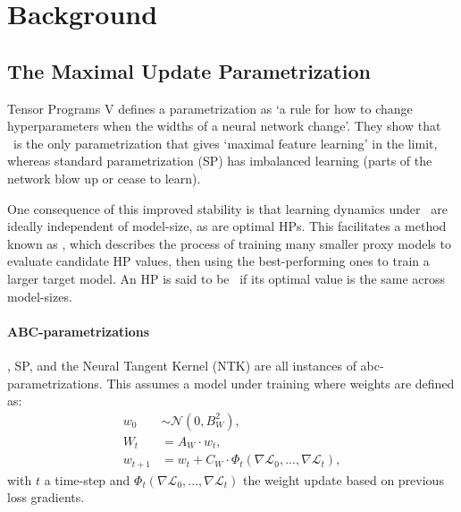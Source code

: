 \section{Background} \label{sec:background}

\subsection{The Maximal Update Parametrization} \label{sec:background:the_maximal_update_parameterization}

Tensor Programs V \citep{Tensor_Programs_V} defines a parametrization as `a rule for how to change hyperparameters when the widths of a neural network change'. They show that \mup\ is the only parametrization that gives `maximal feature learning' in the limit,
whereas standard parametrization (SP) has imbalanced learning (parts of the network blow up or cease to learn).

One consequence of this improved stability is that learning dynamics under \mup\ are ideally independent of model-size, as are optimal HPs. This facilitates a method known as \mut, which describes the process of training many smaller proxy models to evaluate candidate HP values, then using the best-performing ones to train a larger target model. An HP is said to be \mutable\ if its optimal value is the same across model-sizes.

\paragraph{ABC-parametrizations} \mup, SP, and the Neural Tangent Kernel (NTK) \citep{NTK} are all instances of abc-parametrizations. This assumes a model under training where weights are defined as:
\begin{align} \label{eq:abc}
    w_0 &\sim \mathcal{N}(0,B_W^2),
    \\
    W_t &= A_W \cdot w_t, \nonumber
    \\
    w_{t+1} &= w_t + C_W \cdot \Phi_t(\nabla \mathcal{L}_0,...,\nabla \mathcal{L}_t), \nonumber
\end{align}
with $t$ a time-step and $\Phi_t(\nabla \mathcal{L}_0,...,\nabla \mathcal{L}_t)$ the weight update based on previous loss gradients.

